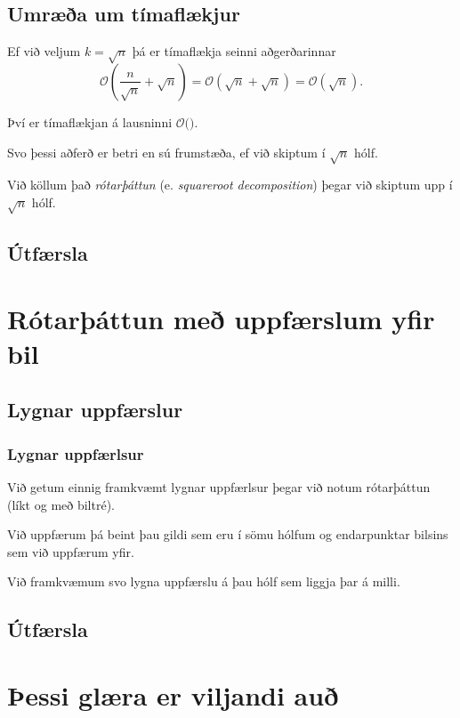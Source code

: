 \subsection{Umræða um tímaflækjur}
{
    {
        \item<1-> Ef við veljum $k = \sqrt{n}$ þá er tímaflækja seinni aðgerðarinnar
            \[
                \mathcal{O} \left (\frac{n}{\sqrt{n}} + \sqrt{n}\right ) = \mathcal{O} (\sqrt{n} + \sqrt{n}) = \mathcal{O} (\sqrt{n}).
            \]
        \item<2-> Því er tímaflækjan á lausninni $\mathcal{O}($$)$.
        \item<4-> Svo þessi aðferð er betri en sú frumstæða, ef við skiptum í $\sqrt{n}$ hólf.
        \item<5-> Við köllum það \emph{rótarþáttun} (e. \emph{squareroot decomposition}) þegar við skiptum upp í $\sqrt{n}$ hólf.
    }
}

\subsection{Útfærsla}
{
}

\section{Rótarþáttun með uppfærslum yfir bil}
\subsection{Lygnar uppfærslur}
{
    \frametitle{Lygnar uppfærlsur}
    {
        \item<1-> Við getum einnig framkvæmt lygnar uppfærlsur þegar við notum rótarþáttun (líkt og með biltré).
        \item<2-> Við uppfærum þá beint þau gildi sem eru í sömu hólfum og endarpunktar bilsins sem við uppfærum yfir.
        \item<3-> Við framkvæmum svo lygna uppfærslu á þau hólf sem liggja þar á milli.
    }
}

\subsection{Útfærsla}
{
}

\section{Þessi glæra er viljandi auð}
{
}


